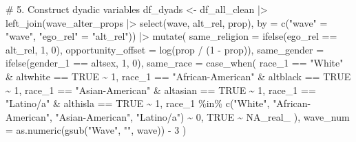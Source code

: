 \documentclass[
  letterpaper,
  DIV=11,
  numbers=noendperiod]{scrartcl}
\newenvironment{Shaded}{\begin{snugshade}}{\end{snugshade}}
\newcommand{\AttributeTok}[1]{\textcolor[rgb]{0.40,0.45,0.13}{#1}}
\newcommand{\CommentTok}[1]{\textcolor[rgb]{0.37,0.37,0.37}{#1}}
\newcommand{\ConstantTok}[1]{\textcolor[rgb]{0.56,0.35,0.01}{#1}}
\newcommand{\DecValTok}[1]{\textcolor[rgb]{0.68,0.00,0.00}{#1}}
\newcommand{\FunctionTok}[1]{\textcolor[rgb]{0.28,0.35,0.67}{#1}}
\newcommand{\NormalTok}[1]{\textcolor[rgb]{0.00,0.23,0.31}{#1}}
\newcommand{\OtherTok}[1]{\textcolor[rgb]{0.00,0.23,0.31}{#1}}
\newcommand{\SpecialCharTok}[1]{\textcolor[rgb]{0.37,0.37,0.37}{#1}}
\newcommand{\StringTok}[1]{\textcolor[rgb]{0.13,0.47,0.30}{#1}}
\begin{document}
\begin{Shaded}
\begin{Highlighting}[]
\CommentTok{\# 5. Construct dyadic variables}
\NormalTok{df\_dyads }\OtherTok{\textless{}{-}}\NormalTok{ df\_all\_clean }\SpecialCharTok{|\textgreater{}}
  \FunctionTok{left\_join}\NormalTok{(wave\_alter\_props }\SpecialCharTok{|\textgreater{}} \FunctionTok{select}\NormalTok{(wave, alt\_rel, prop), }\AttributeTok{by =} \FunctionTok{c}\NormalTok{(}\StringTok{"wave"} \OtherTok{=} \StringTok{"wave"}\NormalTok{, }\StringTok{"ego\_rel"} \OtherTok{=} \StringTok{"alt\_rel"}\NormalTok{)) }\SpecialCharTok{|\textgreater{}}
  \FunctionTok{mutate}\NormalTok{(}
    \AttributeTok{same\_religion =} \FunctionTok{ifelse}\NormalTok{(ego\_rel }\SpecialCharTok{==}\NormalTok{ alt\_rel, }\DecValTok{1}\NormalTok{, }\DecValTok{0}\NormalTok{),}
    \AttributeTok{opportunity\_offset =} \FunctionTok{log}\NormalTok{(prop }\SpecialCharTok{/}\NormalTok{ (}\DecValTok{1} \SpecialCharTok{{-}}\NormalTok{ prop)),}
    \AttributeTok{same\_gender =} \FunctionTok{ifelse}\NormalTok{(gender\_1 }\SpecialCharTok{==}\NormalTok{ altsex, }\DecValTok{1}\NormalTok{, }\DecValTok{0}\NormalTok{),}
    \AttributeTok{same\_race =} \FunctionTok{case\_when}\NormalTok{(}
\NormalTok{      race\_1 }\SpecialCharTok{==} \StringTok{"White"} \SpecialCharTok{\&}\NormalTok{ altwhite }\SpecialCharTok{==} \ConstantTok{TRUE} \SpecialCharTok{\textasciitilde{}} \DecValTok{1}\NormalTok{,}
\NormalTok{      race\_1 }\SpecialCharTok{==} \StringTok{"African{-}American"} \SpecialCharTok{\&}\NormalTok{ altblack }\SpecialCharTok{==} \ConstantTok{TRUE} \SpecialCharTok{\textasciitilde{}} \DecValTok{1}\NormalTok{,}
\NormalTok{      race\_1 }\SpecialCharTok{==} \StringTok{"Asian{-}American"} \SpecialCharTok{\&}\NormalTok{ altasian }\SpecialCharTok{==} \ConstantTok{TRUE} \SpecialCharTok{\textasciitilde{}} \DecValTok{1}\NormalTok{,}
\NormalTok{      race\_1 }\SpecialCharTok{==} \StringTok{"Latino/a"} \SpecialCharTok{\&}\NormalTok{ althisla }\SpecialCharTok{==} \ConstantTok{TRUE} \SpecialCharTok{\textasciitilde{}} \DecValTok{1}\NormalTok{,}
\NormalTok{      race\_1 }\SpecialCharTok{\%in\%} \FunctionTok{c}\NormalTok{(}\StringTok{"White"}\NormalTok{, }\StringTok{"African{-}American"}\NormalTok{, }\StringTok{"Asian{-}American"}\NormalTok{, }\StringTok{"Latino/a"}\NormalTok{) }\SpecialCharTok{\textasciitilde{}} \DecValTok{0}\NormalTok{,}
      \ConstantTok{TRUE} \SpecialCharTok{\textasciitilde{}} \ConstantTok{NA\_real\_}
\NormalTok{    ),}
    \AttributeTok{wave\_num =} \FunctionTok{as.numeric}\NormalTok{(}\FunctionTok{gsub}\NormalTok{(}\StringTok{"Wave"}\NormalTok{, }\StringTok{""}\NormalTok{, wave)) }\SpecialCharTok{{-}} \DecValTok{3}
\NormalTok{  )}
\end{Highlighting}
\end{Shaded}
\end{document}
